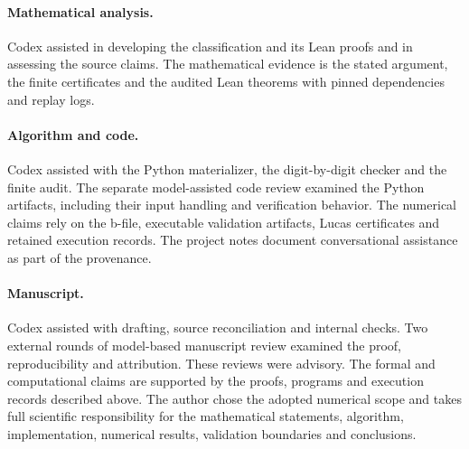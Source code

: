 \documentclass[11pt]{article}
\begin{document}
\paragraph{Mathematical analysis.}
Codex assisted in developing the classification and its Lean proofs
and in assessing the source claims. The mathematical evidence is
the stated argument, the finite certificates and the audited Lean
theorems with pinned dependencies and replay logs.

\paragraph{Algorithm and code.}
Codex assisted with the Python materializer, the digit-by-digit
checker and the finite audit. The separate model-assisted code review
examined the Python artifacts, including their input handling and
verification behavior. The numerical claims rely on the
b-file, executable validation artifacts, Lucas certificates and
retained execution records. The project notes document conversational
assistance as part of the provenance.

\paragraph{Manuscript.}
Codex assisted with drafting, source reconciliation and internal checks.
Two external rounds of model-based manuscript review examined
the proof, reproducibility and attribution. These reviews were advisory.
The formal and computational claims are supported by the proofs,
programs and execution records described above.
The author chose the adopted numerical scope and takes full scientific
responsibility for the mathematical statements, algorithm,
implementation, numerical results, validation boundaries and
conclusions.
\end{document}
